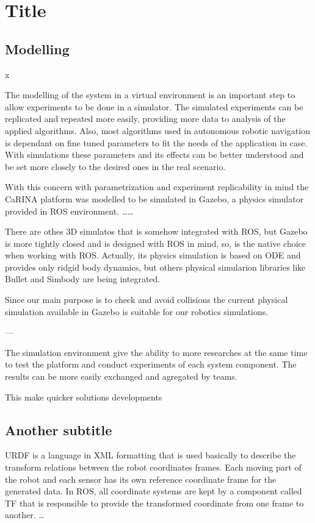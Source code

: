 \section{Title}

\subsection{Modelling}

x

The modelling of the system in a virtual environment is an important step to
allow experiments to be done in a simulator. The simulated experiments can be
replicated and repeated more easily, providing more data to analysis of the
applied algorithms. Also, most algorithms used in autonomous robotic navigation
is dependant on fine tuned parameters to fit the needs of the application in case.
With simulations these parameters and its effects can be better understood and
be set more closely to the desired ones in the real scenario.

With this concern with parametrization and experiment replicability in mind the
CaRINA platform was modelled to be simulated in Gazebo, a physics simulator
provided in ROS environment.  \ldots \ldots

There are othes 3D simulatos that is somehow integrated with ROS, but Gazebo is
more tightly closed and is designed with ROS in mind, so, is the native choice
when working with ROS. Actually, its physics simulation is based on ODE and 
provides only ridgid body dynamics, but others physical simularion libraries
like Bullet and Simbody are being integrated.

Since our main purpose is to check and avoid collisions the current physical
simulation available in Gazebo is suitable for our robotics simulations.

---

The simulation environment give the ability to more researches at the same time
to test the platform and conduct experiments of each system component. The
results can be more easily exchanged and agregated by teams. 


This make quicker solutions developments 


\subsection{Another subtitle}

URDF is a language in XML formatting that is used basically to describe the
transform relations between the robot coordinates frames. Each moving part of
the robot and each sensor has its own reference coordinate frame for the
generated data. In ROS, all coordinate systems are kept by a component called
TF that is responsible to provide the transformed coordinate from one frame to
another. \ldots

